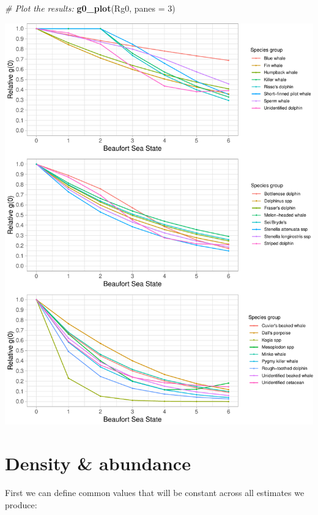 \documentclass[
]{book}
\newenvironment{Shaded}{\begin{snugshade}}{\end{snugshade}}
\newcommand{\CommentTok}[1]{\textcolor[rgb]{0.56,0.35,0.01}{\textit{#1}}}
\newcommand{\DataTypeTok}[1]{\textcolor[rgb]{0.13,0.29,0.53}{#1}}
\newcommand{\DecValTok}[1]{\textcolor[rgb]{0.00,0.00,0.81}{#1}}
\newcommand{\KeywordTok}[1]{\textcolor[rgb]{0.13,0.29,0.53}{\textbf{#1}}}
\newcommand{\NormalTok}[1]{#1}
\begin{document}
\begin{Shaded}
\begin{Highlighting}[]
\CommentTok{# Plot the results: }
\KeywordTok{g0_plot}\NormalTok{(Rg0, }\DataTypeTok{panes =} \DecValTok{3}\NormalTok{)}
\end{Highlighting}
\end{Shaded}

\includegraphics{figures/unnamed-chunk-277-1.pdf}

\hypertarget{density-abundance}{%
\section*{Density \& abundance}\label{density-abundance}}

First we can define common values that will be constant across all estimates we produce:
\end{document}
